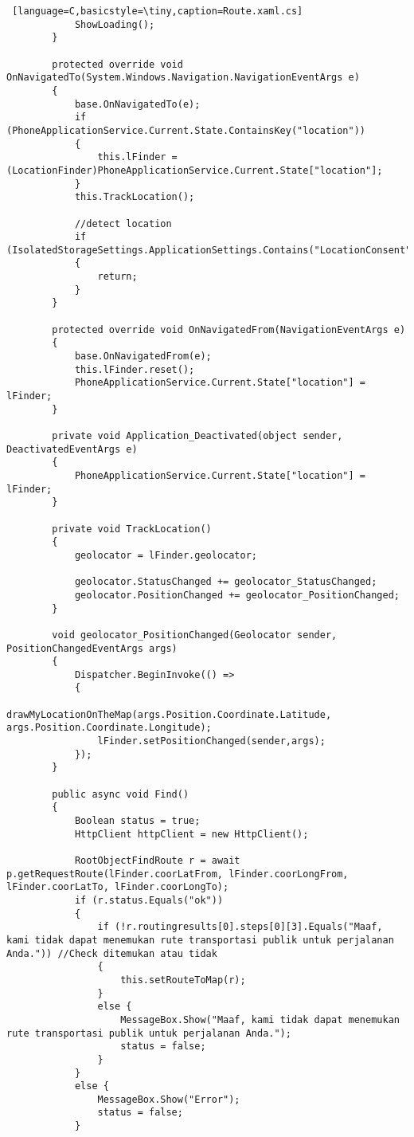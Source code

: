 \begin{lstlisting} [language=C,basicstyle=\tiny,caption=Route.xaml.cs]
            ShowLoading();
        }

        protected override void OnNavigatedTo(System.Windows.Navigation.NavigationEventArgs e)
        {
            base.OnNavigatedTo(e);
            if (PhoneApplicationService.Current.State.ContainsKey("location"))
            {
                this.lFinder = (LocationFinder)PhoneApplicationService.Current.State["location"];
            }
            this.TrackLocation();

            //detect location
            if (IsolatedStorageSettings.ApplicationSettings.Contains("LocationConsent"))
            {
                return;
            }
        }

        protected override void OnNavigatedFrom(NavigationEventArgs e)
        {
            base.OnNavigatedFrom(e);
            this.lFinder.reset();
            PhoneApplicationService.Current.State["location"] = lFinder;
        }

        private void Application_Deactivated(object sender, DeactivatedEventArgs e)
        {
            PhoneApplicationService.Current.State["location"] = lFinder;
        }

        private void TrackLocation()
        {
            geolocator = lFinder.geolocator;

            geolocator.StatusChanged += geolocator_StatusChanged;
            geolocator.PositionChanged += geolocator_PositionChanged;
        }

        void geolocator_PositionChanged(Geolocator sender, PositionChangedEventArgs args)
        {
            Dispatcher.BeginInvoke(() =>
            {
                drawMyLocationOnTheMap(args.Position.Coordinate.Latitude, args.Position.Coordinate.Longitude);
                lFinder.setPositionChanged(sender,args);
            });
        }

        public async void Find()
        {
            Boolean status = true; 
            HttpClient httpClient = new HttpClient();

            RootObjectFindRoute r = await p.getRequestRoute(lFinder.coorLatFrom, lFinder.coorLongFrom, lFinder.coorLatTo, lFinder.coorLongTo);
            if (r.status.Equals("ok"))
            {
                if (!r.routingresults[0].steps[0][3].Equals("Maaf, kami tidak dapat menemukan rute transportasi publik untuk perjalanan Anda.")) //Check ditemukan atau tidak
                {
                    this.setRouteToMap(r);
                }
                else {
                    MessageBox.Show("Maaf, kami tidak dapat menemukan rute transportasi publik untuk perjalanan Anda.");
                    status = false; 
                }
            }
            else {
                MessageBox.Show("Error");
                status = false; 
            }


\end{lstlisting}
